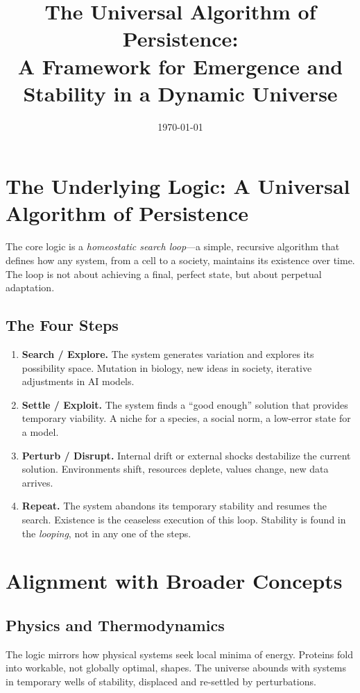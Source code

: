\documentclass[11pt,a4paper]{article}
\title{\textbf{The Universal Algorithm of Persistence:\\
A Framework for Emergence and Stability in a Dynamic Universe}}
\author{}
\date{\today}
\begin{document}
\maketitle
\onehalfspacing

\section*{The Underlying Logic: A Universal Algorithm of Persistence}

The core logic is a \emph{homeostatic search loop}---a simple, recursive algorithm that defines how any system, from a cell to a society, maintains its existence over time. The loop is not about achieving a final, perfect state, but about perpetual adaptation. 

\subsection*{The Four Steps}
\begin{enumerate}[label=\textbf{\arabic*.}]
  \item \textbf{Search / Explore.} The system generates variation and explores its possibility space. Mutation in biology, new ideas in society, iterative adjustments in AI models.
  \item \textbf{Settle / Exploit.} The system finds a ``good enough'' solution that provides temporary viability. A niche for a species, a social norm, a low-error state for a model.
  \item \textbf{Perturb / Disrupt.} Internal drift or external shocks destabilize the current solution. Environments shift, resources deplete, values change, new data arrives.
  \item \textbf{Repeat.} The system abandons its temporary stability and resumes the search. Existence is the ceaseless execution of this loop. Stability is found in the \emph{looping}, not in any one of the steps.
\end{enumerate}

\section*{Alignment with Broader Concepts}

\subsection*{Physics and Thermodynamics}
The logic mirrors how physical systems seek local minima of energy. Proteins fold into workable, not globally optimal, shapes. The universe abounds with systems in temporary wells of stability, displaced and re-settled by perturbations.
\end{document}
